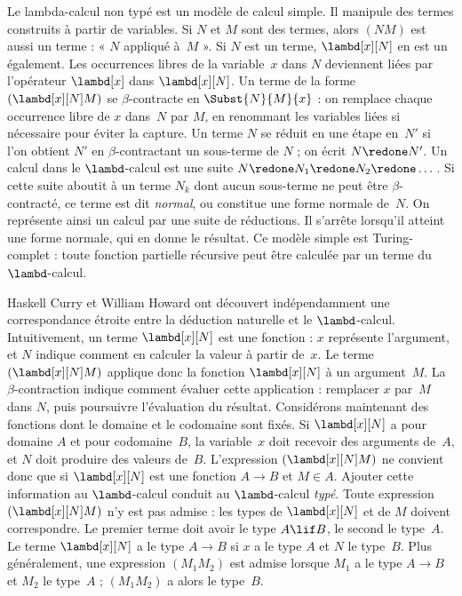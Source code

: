 \documentclass[../../../include/open-logic-section]{subfiles}
\begin{document}


Le lambda-calcul non typé est un modèle de calcul simple. Il manipule
des termes construits à partir de variables. Si $N$ et $M$
sont des termes, alors $(NM)$ est aussi un terme :
« $N$ appliqué à~$M$ ». Si $N$ est un terme,
$\lambd[x][N]$ en est un également. Les occurrences libres
de la variable~$x$ dans $N$ deviennent liées par l'opérateur
$\lambd[x]$ dans $\lambd[x][N]$.
Un terme de la forme $(\lambd[x][N]M)$ se
$\beta$-contracte en $\Subst{N}{M}{x}$ : on remplace
chaque occurrence libre de $x$ dans~$N$ par $M$,
en renommant les variables liées si nécessaire pour éviter
la capture. Un terme $N$ se réduit en une étape en~$N'$
si l'on obtient $N'$ en $\beta$-contractant un sous-terme
de $N$ ; on écrit $N \redone N'$.
Un calcul dans le $\lambd$-calcul est une suite
$N \redone N_1 \redone N_2 \redone \dots$.
Si cette suite aboutit à un terme $N_k$ dont aucun sous-terme
ne peut être $\beta$-contracté, ce terme est dit \emph{normal},
ou constitue une forme normale de~$N$.
On représente ainsi un calcul par une suite de réductions.
Il s'arrête lorsqu'il atteint une forme normale, qui en donne
le résultat. Ce modèle simple est Turing-complet : toute
fonction partielle récursive peut être calculée par un terme
du $\lambd$-calcul.

Haskell Curry et William Howard ont découvert indépendamment
une correspondance étroite entre la déduction naturelle et le
$\lambd$-calcul. Intuitivement, un terme $\lambd[x][N]$
est une fonction : $x$ représente l'argument, et $N$ indique
comment en calculer la valeur à partir de~$x$.
Le terme $(\lambd[x][N]M)$ applique donc la fonction
$\lambd[x][N]$ à un argument~$M$. La $\beta$-contraction
indique comment évaluer cette application : remplacer
$x$ par~$M$ dans $N$, puis poursuivre l'évaluation du résultat.
Considérons maintenant des fonctions dont le domaine et le
codomaine sont fixés. Si $\lambd[x][N]$ a pour domaine $A$
et pour codomaine~$B$, la variable~$x$ doit recevoir
des arguments de~$A$, et $N$ doit produire des valeurs de~$B$.
L'expression $(\lambd[x][N]M)$ ne convient donc que si
$\lambd[x][N]$ est une fonction $A \to B$ et $M \in A$.
Ajouter cette information au $\lambd$-calcul conduit au
$\lambd$-calcul \emph{typé}.
Toute expression $(\lambd[x][N]M)$ n'y est pas admise :
les types de $\lambd[x][N]$ et de $M$ doivent correspondre.
Le premier terme doit avoir le type $A \lif B$, le second
le type~$A$. Le terme $\lambd[x][N]$ a le type $A \to B$
si $x$ a le type $A$ et $N$ le type~$B$.
Plus généralement, une expression $(M_1M_2)$ est admise
lorsque $M_1$ a le type $A \to B$ et $M_2$ le type~$A$ ;
$(M_1M_2)$ a alors le type~$B$.
\end{document}
